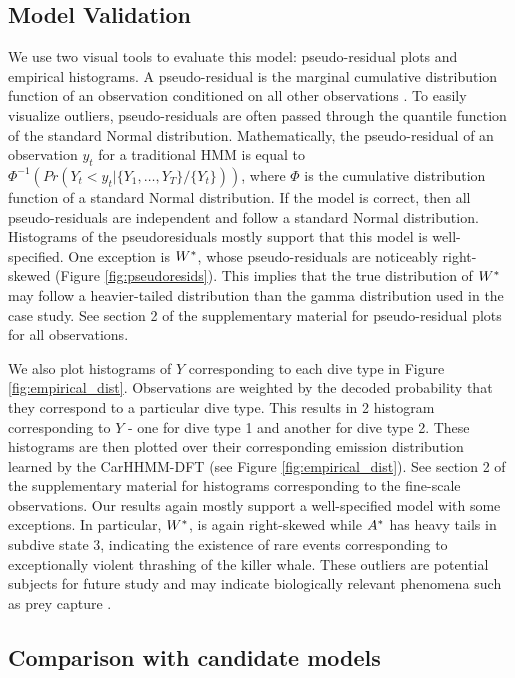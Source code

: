 \subsection{Model Validation}
\label{subsec:model_validation}

We use two visual tools to evaluate this model: pseudo-residual plots and empirical histograms. A pseudo-residual is the marginal cumulative distribution function of an observation conditioned on all other observations \citep{Zucchini:2016}. To easily visualize outliers, pseudo-residuals are often passed through the quantile function of the standard Normal distribution. Mathematically, the pseudo-residual of an observation $y_t$ for a traditional HMM is equal to $\Phi^{-1} \left(Pr(Y_t < y_t|\{Y_1,\ldots,Y_T\}/\{Y_t\}) \right)$, where $\Phi$ is the cumulative distribution function of a standard Normal distribution. If the model is correct, then all pseudo-residuals are independent and follow a standard Normal distribution. Histograms of the pseudoresiduals mostly support that this model is well-specified. One exception is $W^*$, whose pseudo-residuals are noticeably right-skewed (Figure \ref{fig:pseudoresids}). This implies that the true distribution of $W^*$ may follow a heavier-tailed distribution than the gamma distribution used in the case study. See section 2 of the supplementary material for pseudo-residual plots for all observations.

We also plot histograms of $Y$ corresponding to each dive type in Figure \ref{fig:empirical_dist}. Observations are weighted by the decoded probability that they correspond to a particular dive type. This results in 2 histogram corresponding to $Y$ - one for dive type 1 and another for dive type 2. These histograms are then plotted over their corresponding emission distribution learned by the CarHHMM-DFT (see Figure \ref{fig:empirical_dist}). See section 2 of the supplementary material for histograms corresponding to the fine-scale observations. Our results again mostly support a well-specified model with some exceptions. In particular, $W^*$, is again right-skewed while $A^*$ has heavy tails in subdive state 3, indicating the existence of rare events corresponding to exceptionally violent thrashing of the killer whale. These outliers are potential subjects for future study and may indicate biologically relevant phenomena such as prey capture \citep{Tennessen:2019a}.

\subsection{Comparison with candidate models}

